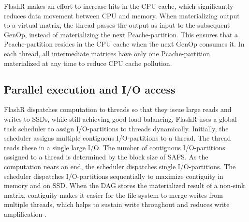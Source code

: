 FlashR makes an effort to increase hits in the CPU cache, which
significantly reduces data movement between CPU and memory.
When materializing output to a virtual matrix, the thread passes
the output as input to the subsequent
GenOp, instead of materializing the next Pcache-partition.
This ensures that a Pcache-partition resides in the CPU cache
when the next GenOp consumes it. 
In each thread, all intermediate matrices have only one 
Pcache-partition materialized
at any time to reduce CPU cache pollution.




\subsection{Parallel execution and I/O access}
FlashR dispatches computation to threads so that they
issue large reads and writes to SSDs, while still achieving good load balancing.
FlashR uses a global task scheduler to assign I/O-partitions to threads
dynamically. Initially, the scheduler assigns multiple contiguous I/O-partitions
to a thread. The thread reads these in a single large I/O.
The number of contiguous I/O-partitions assigned to a thread is determined by
the block size of SAFS.
As the computation nears an end, the scheduler dispatches single I/O-partitions. 
The scheduler dispatches I/O-partitions sequentially to maximize contiguity in memory
and on SSD. When the DAG stores the materialized result of a non-sink matrix,
contiguity makes it easier for the file system to merge
writes from multiple threads, which helps to sustain write throughout and reduces
write amplification \cite{ripq}.


